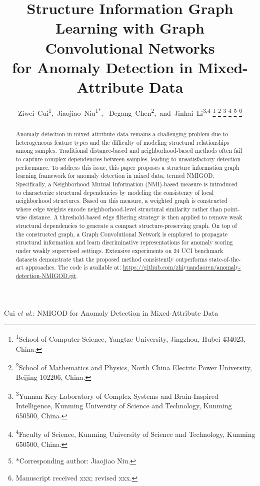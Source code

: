 \documentclass[lettersize,journal]{IEEEtran}
\begin{document}
\title{Structure Information Graph Learning with Graph Convolutional Networks\\ for Anomaly Detection in Mixed-Attribute Data}

\author{Ziwei~Cui\textsuperscript{1},~Jiaojiao~Niu\textsuperscript{1*},~
        Degang~Chen\textsuperscript{2},~and~Jinhai~Li\textsuperscript{3,4}
\thanks{\textsuperscript{1}School of Computer Science, Yangtze University, Jingzhou, Hubei 434023, China.}
\thanks{\textsuperscript{2}School of Mathematics and Physics, North China Electric Power University, Beijing 102206, China.}
\thanks{\textsuperscript{3}Yunnan Key Laboratory of Complex Systems and Brain-Inspired Intelligence,
        Kunming University of Science and Technology, Kunming 650500, China.}
\thanks{\textsuperscript{4}Faculty of Science, Kunming University of Science and Technology, Kunming 650500, China.}
\thanks{*Corresponding author: Jiaojiao Niu.}
\thanks{Manuscript received xxx; revised xxx.}}

%
{Cui \MakeLowercase{\textit{et al.}}: NMIGOD for Anomaly Detection in Mixed-Attribute Data}

\maketitle

\begin{abstract}
Anomaly detection in mixed-attribute data remains a challenging problem due to heterogeneous feature types
and the difficulty of modeling structural relationships among samples. Traditional distance-based and
neighborhood-based methods often fail to capture complex dependencies between samples, leading to
unsatisfactory detection performance. To address this issue, this paper proposes a structure information
graph learning framework for anomaly detection in mixed data, termed NMIGOD. Specifically, a Neighborhood
Mutual Information (NMI)-based measure is introduced to characterize structural dependencies by modeling
the consistency of local neighborhood structures. Based on this measure, a weighted graph is constructed
where edge weights encode neighborhood-level structural similarity rather than point-wise distance. A
threshold-based edge filtering strategy is then applied to remove weak structural dependencies to generate
a compact structure-preserving graph. On top of the constructed graph, a Graph Convolutional Network is
employed to propagate structural information and learn discriminative representations for anomaly scoring
under weakly supervised settings. Extensive experiments on 24 UCI benchmark datasets demonstrate that
the proposed method consistently outperforms state-of-the-art approaches. The code is available at:
\url{https://github.com/zhiyuandaoren/anomaly-detection-NMIGOD.git}.
\end{abstract}
\end{document}
